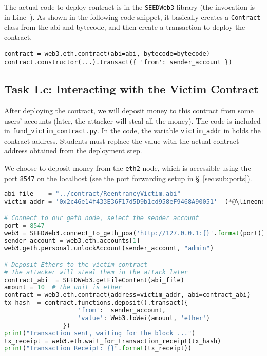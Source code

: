 The actual code to deploy contract is in the \texttt{SEEDWeb3} 
library (the invocation is in Line~\lineone). 
As shown in the following code snippet, 
it basically creates a \texttt{Contract} class from the abi and 
bytecode, and then create a transaction to deploy the contract.

\begin{lstlisting}
contract = web3.eth.contract(abi=abi, bytecode=bytecode)
contract.constructor(...).transact({ 'from': sender_account })
\end{lstlisting}
 


\subsection{Task 1.c: Interacting with the Victim Contract} 

After deploying the contract, we will deposit money to this contract
from some users' accounts (later, the attacker will steal all the
money). The code is included in \texttt{fund\_victim\_contract.py}. 
In the code, the variable \texttt{victim\_addr} in \lineone
holds the contract address. Students must replace the value
with the actual contract address obtained from the 
deployment step. 


We choose to deposit money from the \texttt{eth2} node, which
is accessible using the port \texttt{8547} on the 
localhost (see the port forwarding setup in \S~\ref{sec:sub:ports}).

\begin{lstlisting}[language=python,
        caption=Deposit money (\texttt{fund\_victim\_contract.py})]
abi_file    = "../contract/ReentrancyVictim.abi"
victim_addr = '0x2c46e14f433E36F17d5D9b1cd958eF9468A90051'  (*@\lineone@*) 

# Connect to our geth node, select the sender account
port = 8547
web3 = SEEDWeb3.connect_to_geth_poa('http://127.0.0.1:{}'.format(port))
sender_account = web3.eth.accounts[1]
web3.geth.personal.unlockAccount(sender_account, "admin")

# Deposit Ethers to the victim contract
# The attacker will steal them in the attack later
contract_abi  = SEEDWeb3.getFileContent(abi_file)
amount = 10  # the unit is ether
contract = web3.eth.contract(address=victim_addr, abi=contract_abi)
tx_hash  = contract.functions.deposit().transact({
                    'from':  sender_account,
                    'value': Web3.toWei(amount, 'ether')
                })
print("Transaction sent, waiting for the block ...")
tx_receipt = web3.eth.wait_for_transaction_receipt(tx_hash)
print("Transaction Receipt: {}".format(tx_receipt))
\end{lstlisting}


